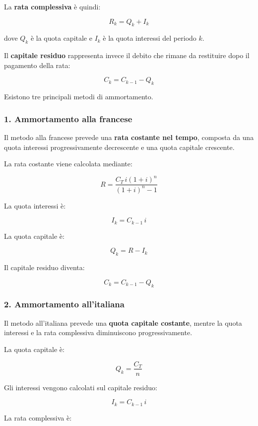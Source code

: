 \noindent La \textbf{rata complessiva} è quindi:

\[
\boxed{R_k=Q_k+I_k}
\]

\noindent dove $Q_k$ è la quota capitale e $I_k$ è la quota interessi del periodo $k$.

\medskip

\noindent Il \textbf{capitale residuo} rappresenta invece il debito che rimane da restituire dopo il pagamento della rata:

\[
\boxed{C_k=C_{k-1}-Q_k}
\]

\noindent Esistono tre principali metodi di ammortamento.

\subsubsection*{1. Ammortamento alla francese}

\noindent Il metodo alla francese prevede una \textbf{rata costante nel tempo}, composta da una quota interessi progressivamente decrescente e una quota capitale crescente.

\medskip

\noindent La rata costante viene calcolata mediante:

\[
\boxed{
R=\frac{C_T\,i(1+i)^n}{(1+i)^n-1}
}
\]

\noindent La quota interessi è:

\[
I_k=C_{k-1}\,i
\]

\noindent La quota capitale è:

\[
Q_k=R-I_k
\]

\noindent Il capitale residuo diventa:

\[
C_k=C_{k-1}-Q_k
\]

\subsubsection*{2. Ammortamento all'italiana}

\noindent Il metodo all'italiana prevede una \textbf{quota capitale costante}, mentre la quota interessi e la rata complessiva diminuiscono progressivamente.

\medskip

\noindent La quota capitale è:

\[
\boxed{Q_k=\frac{C_T}{n}}
\]

\noindent Gli interessi vengono calcolati sul capitale residuo:

\[
I_k=C_{k-1}\,i
\]

\noindent La rata complessiva è:

